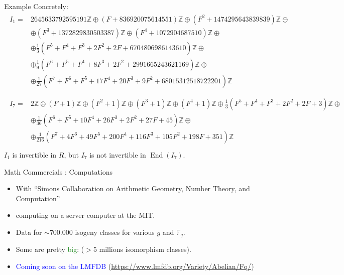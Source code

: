 \documentclass[usenames,dvipsnames]{beamer}
\def\Z{\mathbb{Z}}
\def\F{\mathbb{F}}
\DeclareMathOperator{\End}{End}
\newcommand{\blue}[1]{\textcolor{blue}{#1}}
\newcommand{\green}[1]{\textcolor{ForestGreen}{#1}}
\begin{document}
\begin{frame}{Example}{}
Concretely:
{\scriptsize \begin{align*}
  \begin{split} 
  I_1 = & 2645633792595191 \Z \oplus (F + 836920075614551) \Z \oplus (F^2 + 1474295643839839)\Z \oplus\\
	& \oplus (F^3 + 1372829830503387)\Z \oplus (F^4 + 1072904687510)\Z \oplus\\
	& \oplus \frac{1}{3}(F^5 + F^4 + F^3 + 2F^2 + 2F + 6704806986143610)\Z \oplus\\
	& \oplus \frac{1}{9}(F^6 + F^5 + F^4 + 8F^3 + 2F^2 + 2991665243621169) \Z \oplus\\
	& \oplus \frac{1}{27}(F^7 + F^6 + F^5 + 17F^4 + 20F^3 + 9F^2 + 68015312518722201)\Z\\
  \end{split}\\  
  \begin{split} 
  I_7 = & 2\Z\oplus(F + 1)\Z\oplus(F^2 + 1)\Z\oplus(F^3 + 1)\Z\oplus(F^4 + 1)\Z\oplus\frac13(F^5 + F^4 + F^3 + 2F^2 + 2F + 3)\Z \oplus \\ 		      & \oplus\frac{1}{36}(F^6 + F^5 + 10F^4 + 26F^3 + 2F^2 + 27F + 45)\Z\oplus\\
	& \oplus \frac{1}{216}(F^7 + 4F^6 + 49F^5 + 200F^4 + 116F^3 + 105F^2 + 198F + 351)\Z\\
  \end{split}
  \end{align*}}
\pause $I_1$ is invertible in $R$, but $I_7$ is not invertible in $\End(I_7)$.
\end{frame}

\begin{frame}{ Math Commercials : Computations }
\begin{itemize}\setlength\itemsep{1em}
 \pause \item With ``Simons Collaboration on Arithmetic Geometry, Number Theory, and Computation''
 
 \pause \item computing on a server computer at the MIT.
 
 \pause \item Data for $\sim 700.000$ isogeny classes for various $g$ and $\F_q$.
 
 \pause \item Some are pretty \green{big}: ($> 5$ millions isomorphism classes).\\
 
 \pause \item \blue{Coming soon on the LMFDB} (\url{https://www.lmfdb.org/Variety/Abelian/Fq/})

\end{itemize}
\end{frame}
\end{document}
